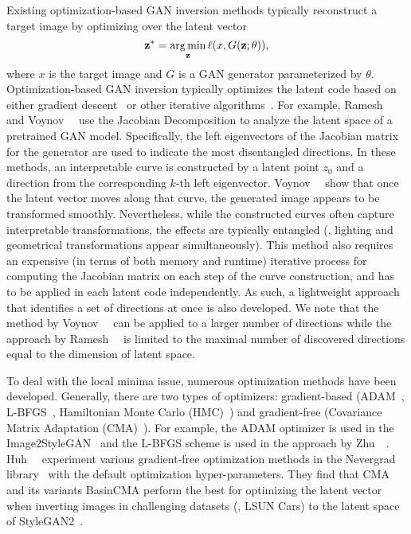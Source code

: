 Existing optimization-based GAN inversion methods typically reconstruct a target image by optimizing over the latent vector
\begin{equation}
\z^* = \underset{\z}{\arg\min}\, \ell(x, G(\z; \theta)),
\label{eqn:opt}
\end{equation}
where $x$ is the target image and $G$ is a GAN generator parameterized by $\theta$.
Optimization-based GAN inversion typically optimizes the latent code based on either gradient descent~\cite{creswell2018inverting,lipton2017precise,ma2018invertibility,creswell2018inverting,abdal2019image2stylegan,abdal2020image2stylegan2,lipton2017precise} or other iterative algorithms~\cite{voynov2020latent, ramesh2018spectral}.
For example, Ramesh~\etal~\cite{ramesh2018spectral} and Voynov~\etal~\cite{voynov2020latent} use the Jacobian Decomposition to analyze the latent space of a pretrained GAN model. 
Specifically, the left eigenvectors of the Jacobian matrix for the generator are used to indicate the most disentangled directions. 
In these methods, an interpretable curve is constructed by a latent point $z_0$ and a direction from the corresponding $k$-th left eigenvector. 
Voynov~\etal~\cite{voynov2020latent} show that once the latent vector moves along that curve, the generated image appears to be transformed smoothly. 
Nevertheless, while the constructed curves often capture interpretable transformations, the effects are typically entangled (\ie, lighting and geometrical transformations appear simultaneously). 
This method also requires an expensive (in terms of both memory and runtime) iterative process for computing the Jacobian matrix on each step of the curve construction, and has to be applied in each latent code independently. 
As such, a lightweight approach that identifies a set of directions at once is also developed. 
We note that the method by Voynov~\etal~\cite{voynov2020latent} can be applied to a larger number of directions while the approach by Ramesh~\etal~\cite{ramesh2018spectral} is limited to the maximal number of discovered directions equal to the dimension of latent space.
 
To deal with the local minima issue, numerous optimization methods have been developed. Generally, there are two types of optimizers: gradient-based (ADAM~\cite{kingma2014adam}, L-BFGS~\cite{liu1989limited}, Hamiltonian Monte Carlo (HMC)~\cite{duane1987hybrid}) and gradient-free (Covariance Matrix Adaptation (CMA)~\cite{hansen2001cma}).
For example, the ADAM optimizer is used in the Image2StyleGAN~\cite{abdal2019image2stylegan} and the L-BFGS scheme is used in the approach by Zhu~\etal~\cite{zhu2016generative}.
Huh~\etal~\cite{huh2020transforming} experiment various gradient-free optimization methods in the Nevergrad library~\cite{nevergrad} with the default optimization hyper-parameters. They find that CMA and its variants BasinCMA perform the best for optimizing the latent vector when inverting images in challenging datasets (\eg, LSUN Cars) to the latent space of StyleGAN2~\cite{karras2020analyzing}.

